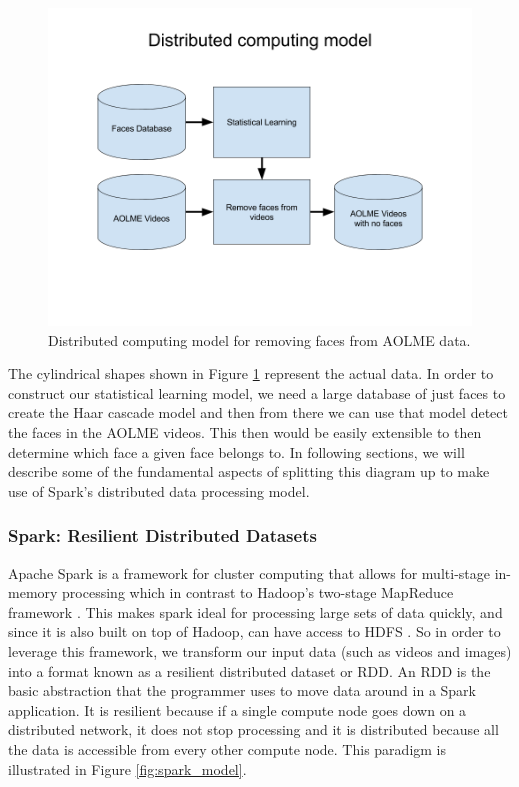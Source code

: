 \documentclass[
	submission,
	final,
	notitlepage,
	narroweqnarray,
	inline,
	twoside,
	]{ieee}
\begin{document}
\begin{figure}[h]
\centering
\includegraphics[width=\linewidth]{figures/face_detection_block_diagram}
\caption{Distributed computing model for removing faces from AOLME data.}
\label{fig:distributed_computing_model} 
\end{figure}

\FloatBarrier

The cylindrical shapes shown in Figure \ref{fig:distributed_computing_model}
represent the actual data. In order to construct our statistical learning model,
we need a large database of just faces to create the Haar cascade model
and then from there we can use that model detect the faces in the AOLME
videos. This then would be easily extensible to then determine
which face a given face belongs to. In following sections, we will describe some of the 
fundamental aspects of splitting this diagram up to make use of Spark's
distributed data processing model. 

\subsubsection{Spark: Resilient Distributed Datasets}
Apache Spark is a framework for cluster computing that allows for multi-stage
in-memory processing which in contrast to Hadoop's two-stage MapReduce
framework \cite{spark} \cite{hadoop}. This makes spark ideal for
processing large sets of data quickly, and since it is also built 
on top of Hadoop, can have access to HDFS \cite{spark}. So in order
to leverage this framework, we transform our input data (such as videos
and images) into a format known as a resilient distributed dataset 
or RDD. An RDD is the basic abstraction that the programmer uses
to move data around in a Spark application. It is resilient because
if a single compute node goes down on a distributed network, it does
not stop processing and it is distributed because all the data is 
accessible from every other compute node. This paradigm is illustrated
in Figure \ref{fig:spark_model}.
\end{document}
